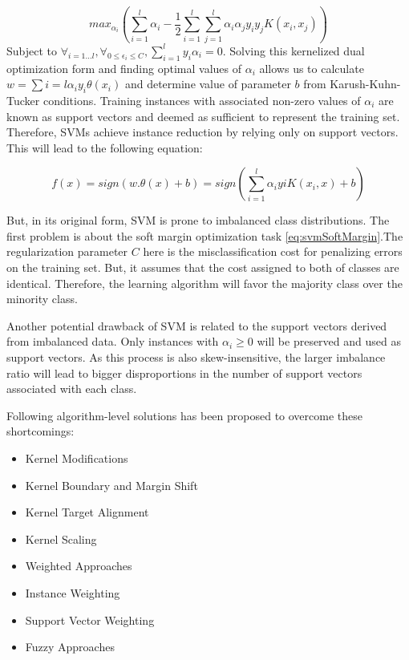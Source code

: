 \begin{equation}
    max_{\alpha_{i}} \left ( \sum_{i=1}^{l}\alpha_{i} - \frac{1}{2}\sum_{i=1}^{l}\sum_{j=1}^{l}\alpha_{i}\alpha_{j}y_{i}y_{j} K(x_{i},x_{j}) \right )
    \label{eq:svmOptimization}
\end{equation}
Subject to $\forall_{i=1...l}, \forall_{0\leq\epsilon_{i} \leq C}, \sum_{i=1}^{l} y_{i}\alpha_{i}=0$. 
Solving this kernelized dual optimization form and finding optimal values of $\alpha_{i}$ allows us 
to calculate $w=\sum i = l\alpha_{i}y_{i}\theta(x_{i})$ and determine value of parameter $b$ from 
Karush-Kuhn-Tucker conditions. Training instances with associated non-zero values of $\alpha_{i}$ 
are known as support vectors and deemed as sufficient to represent the training set. 
Therefore, SVMs achieve instance reduction by relying only on support vectors. This will lead to 
the following equation:

\begin{equation}
    f(x)= sign (w.\theta(x)+b) = sign \left ( \sum_{i=1}^{l}\alpha_{i}y{i}K(x_{i},x)+b \right )
    \label{eq:svmFinal}
\end{equation}

But, in its original form, SVM is prone to imbalanced class distributions. The first problem 
is about the soft margin optimization task \ref{eq:svmSoftMargin}.The regularization parameter 
$C$ here is the misclassification cost for penalizing errors on the training set. But, it 
assumes that the cost assigned to both of classes are identical. Therefore, the learning 
algorithm will favor the majority class over the minority class.

Another potential drawback of SVM is related to the support vectors derived from imbalanced data. 
Only instances with $\alpha_{i} \geq0$ will be preserved and used as support vectors. As this 
process is also skew-insensitive, the larger imbalance ratio will lead to bigger disproportions in 
the number of support vectors associated with each class. 

Following algorithm-level solutions has been proposed to overcome these shortcomings:
\begin{itemize}
    \item \small{Kernel Modifications}
    \item \small{Kernel Boundary and Margin Shift}
    \item \small{Kernel Target Alignment}
    \item \small{Kernel Scaling}
    \item \small{Weighted Approaches}
    \item \small{Instance Weighting}
    \item \small{Support Vector Weighting}
    \item \small{Fuzzy Approaches}
\end{itemize}

